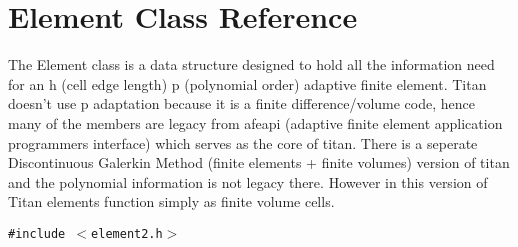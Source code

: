 \hypertarget{classElement}{
\section{Element Class Reference}
\label{classElement}
}
The Element class is a data structure designed to hold all the information need for an h (cell edge length) p (polynomial order) adaptive finite element. Titan doesn't use p adaptation because it is a finite difference/volume code, hence many of the members are legacy from afeapi (adaptive finite element application programmers interface) which serves as the core of titan. There is a seperate Discontinuous Galerkin Method (finite elements + finite volumes) version of titan and the polynomial information is not legacy there. However in this version of Titan elements function simply as finite volume cells.  


{\tt \#include $<$element2.h$>$}

